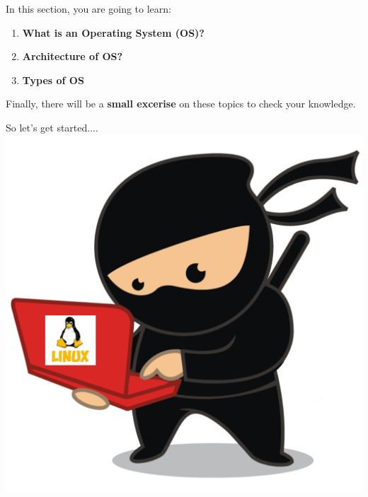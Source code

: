 \setlength{\columnsep}{3pt}
\begin{flushleft}
	\bigskip
	\bigskip
	\begin{tcolorbox}[breakable,notitle,boxrule=1pt,colback=black,colframe=black]
	\color{white}
	\bigskip
	In this section, you are going to learn:
	\begin{enumerate}
		\item \textbf{What is an Operating System (OS)?}
		\item \textbf{Architecture of OS?}
		\item \textbf{Types of OS}
	\end{enumerate}	
	\bigskip
	Finally, there will be a \textbf{small excerise} on these topics to check your knowledge.
	\bigskip
	\end{tcolorbox}

	
	\bigskip
	\bigskip
	
	\begin{multicols}{2}
		\vspace*{\fill}
		\vspace*{\fill}
		\vspace*{\fill}
		\vspace*{\fill}
		\vspace*{\fill}
		\vspace*{\fill}
		\vspace*{\fill}
		\vspace*{\fill}
		\vspace*{\fill}
		
		\vfill \null
		\columnbreak
		So let's get started....
		\includegraphics[scale=0.08]{content/linux_section.png}
	\end{multicols}	
	
\end{flushleft}

\newpage





